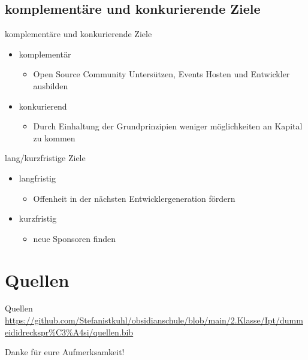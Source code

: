\documentclass[11pt,aspectratio=169]{beamer}
\begin{document}
\subsection {komplementäre und konkurierende Ziele}
\begin{frame}{komplementäre und konkurierende Ziele}
	\begin{itemize}
		\item komplementär
			\begin{itemize}
				\item Open Source Community Untersützen, Events Hosten und Entwickler ausbilden
			\end{itemize}
	\end{itemize}
	\begin{itemize}
		\item konkurierend
			\begin{itemize}
				\item Durch Einhaltung der Grundprinzipien weniger möglichkeiten an Kapital zu kommen
			\end{itemize}
	\end{itemize}
\end{frame}
\begin{frame}{lang/kurzfristige Ziele}
	\begin{itemize}
		\item langfristig
			\begin{itemize}
				\item Offenheit in der nächsten Entwicklergeneration fördern
			\end{itemize}
	\end{itemize}
	\begin{itemize}
		\item kurzfristig
			\begin{itemize}
				\item neue Sponsoren finden
			\end{itemize}
	\end{itemize}
\end{frame}

\section{Quellen}
\begin{frame}{Quellen}
	\centering
	\url{https://github.com/Stefanistkuhl/obsidianschule/blob/main/2.Klasse/Ipt/dummeididreckspr\%C3\%A4si/quellen.bib}
	
	
\end{frame}
\begin{frame}{Danke für eure Aufmerksamkeit!}
\end{frame}
\end{document}
